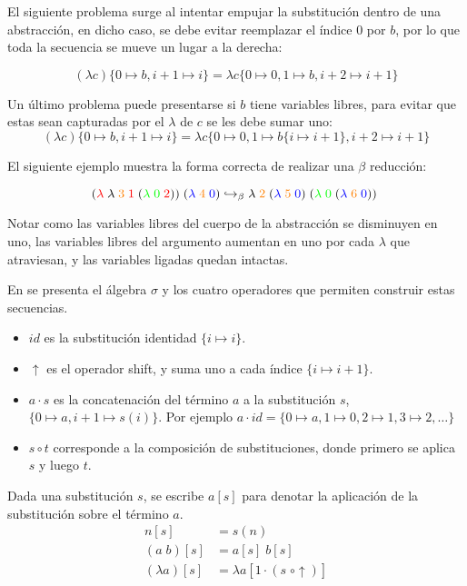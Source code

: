 \documentclass[]{report}
\begin{document}
	El siguiente problema surge al intentar empujar la substitución dentro de una abstracción, en dicho caso, se debe evitar reemplazar el índice 0 por $b$, por lo que toda la secuencia se mueve un lugar a la derecha:
	
	\[ (\lambda c)\{ 0 \mapsto b, i+1\mapsto i \} = \lambda c \{ 0 \mapsto 0, 1 \mapsto b, i+2\mapsto i+1 \} \]
	
	Un último problema puede presentarse si $b$ tiene variables libres, para evitar que estas sean capturadas por el $\lambda$ de $c$ se les debe sumar uno:
	\[ (\lambda c)\{ 0 \mapsto b, i+1\mapsto i \} = \lambda c \{ 0 \mapsto 0, 1 \mapsto b \{ i \mapsto i+1 \}, i+2\mapsto i+1 \} \]
	
	El siguiente ejemplo muestra la forma correcta de realizar una $\beta$ reducción:
	
	\[
	(\textcolor{red}{\lambda}\; \lambda\; \textcolor{orange}{3}\; \textcolor{red}{1}\; (\textcolor{green}{\lambda\; 0}\; \textcolor{red}{2}))\; (\textcolor{blue}{\lambda}\; \textcolor{orange}{4}\; \textcolor{blue}{0})
	\hookrightarrow_\beta
	\lambda \; \textcolor{orange}{2} \; (\textcolor{blue}{\lambda}\; \textcolor{orange}{5}\; \textcolor{blue}{0})\; (\textcolor{green}{\lambda\; 0}\; (\textcolor{blue}{\lambda}\; \textcolor{orange}{6}\; \textcolor{blue}{0}))\;
	\]
	
	Notar como las variables libres del cuerpo de la abstracción se disminuyen en uno, las variables libres del argumento aumentan en uno por cada $\lambda$ que atraviesan, y las variables ligadas quedan intactas.
	
	
	En \cite{explicit_subs} se presenta el álgebra $\sigma$ y los cuatro operadores que permiten construir estas secuencias.

	\begin{itemize}
		\item $id$ es la substitución identidad $\{i \mapsto i\}$.
		\item $\uparrow$ es el operador shift, y suma uno a cada índice $\{i \mapsto i+1\}$.
		\item $a \cdot s$ es la concatenación del término $a$ a la substitución $s$, $\{0 \mapsto a, i+1 \mapsto s(i)\}$. Por ejemplo $a \cdot id = \{ 0 \mapsto a, 1 \mapsto 0, 2 \mapsto 1, 3 \mapsto 2, \dots \} $
		\item $s \circ t$ corresponde a la composición de substituciones, donde primero se aplica $s$ y luego $t$.
	\end{itemize}
	
	Dada una substitución $s$, se escribe $a[s]$ para denotar la aplicación de la substitución sobre el término $a$.
	\begin{align*}
		n[s] &= s(n) \\
		(a\; b)[s] &= a[s]\; b[s] \\
		(\lambda a)[s] &= \lambda a[1 \cdot (s \; \circ \uparrow)]
	\end{align*}
	
\end{document}
